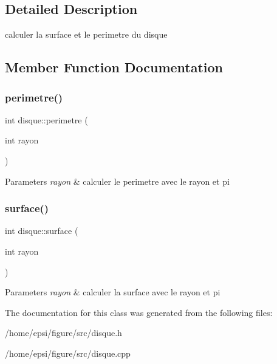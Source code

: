 \subsection{Detailed Description}
calculer la surface et le perimetre du disque 

\subsection{Member Function Documentation}
\mbox{\label{classdisque_a48361c6c20641c3da6db79b05e8facd6}} 
\subsubsection{\texorpdfstring{perimetre()}{perimetre()}}
{\footnotesize\ttfamily int disque\+::perimetre (\begin{DoxyParamCaption}\item[{int}]{rayon }\end{DoxyParamCaption})}


\begin{DoxyParams}{Parameters}
{\em rayon} & calculer le perimetre avec le rayon et pi \\
\hline
\end{DoxyParams}
\mbox{\label{classdisque_a24cfaf289fe88cfcf71e3968edbd9bf4}} 
\subsubsection{\texorpdfstring{surface()}{surface()}}
{\footnotesize\ttfamily int disque\+::surface (\begin{DoxyParamCaption}\item[{int}]{rayon }\end{DoxyParamCaption})}


\begin{DoxyParams}{Parameters}
{\em rayon} & calculer la surface avec le rayon et pi \\
\hline
\end{DoxyParams}


The documentation for this class was generated from the following files\+:\begin{DoxyCompactItemize}
\item 
/home/epsi/figure/src/disque.\+h\item 
/home/epsi/figure/src/disque.\+cpp\end{DoxyCompactItemize}
